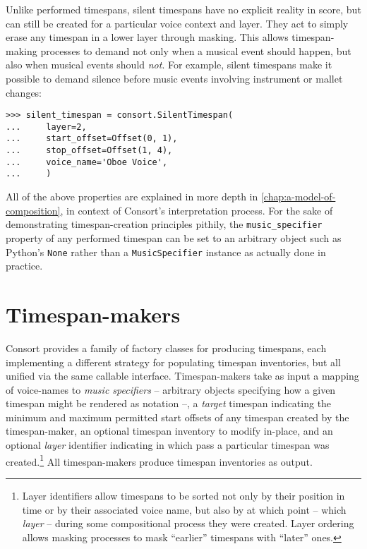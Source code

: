 \noindent Unlike performed timespans, silent timespans have no explicit reality
in score, but can still be created for a particular voice context and layer.
They act to simply erase any timespan in a lower layer through masking. This
allows timespan-making processes to demand not only when a musical event should
happen, but also when musical events should \emph{not}. For example, silent
timespans make it possible to demand silence before music events involving
instrument or mallet changes:

\begin{comment}
<abjad>
silent_timespan = consort.SilentTimespan(
    layer=2,
    start_offset=Offset(0, 1),
    stop_offset=Offset(1, 4),
    voice_name='Oboe Voice',
    )
</abjad>
\end{comment}

\begin{singlespacing}
\vspace{-0.5\baselineskip}
\begin{lstlisting}
>>> silent_timespan = consort.SilentTimespan(
...     layer=2,
...     start_offset=Offset(0, 1),
...     stop_offset=Offset(1, 4),
...     voice_name='Oboe Voice',
...     )
\end{lstlisting}
\end{singlespacing}

\noindent All of the above properties are explained in more depth in
\autoref{chap:a-model-of-composition}, in context of Consort's interpretation
process. For the sake of demonstrating timespan-creation principles pithily,
the \texttt{music\_specifier} property of any performed timespan can be set to
an arbitrary object such as Python's \texttt{None} rather than a
\texttt{MusicSpecifier} instance as actually done in practice.

\section{Timespan-makers}
\label{sec:timespan-makers}

Consort provides a family of factory classes for producing timespans, each
implementing a different strategy for populating timespan inventories, but all
unified via the same callable interface. Timespan-makers take as input a
mapping of voice-names to \emph{music specifiers} -- arbitrary objects
specifying how a given timespan might be rendered as notation --, a
\emph{target} timespan indicating the minimum and maximum permitted start
offsets of any timespan created by the timespan-maker, an optional timespan
inventory to modify in-place, and an optional \emph{layer} identifier
indicating in which pass a particular timespan was created.\footnote{Layer
identifiers allow timespans to be sorted not only by their position in time or
by their associated voice name, but also by at which point -- which
\emph{layer} -- during some compositional process they were created. Layer
ordering allows masking processes to mask \enquote{earlier} timespans with
\enquote{later} ones.} All timespan-makers produce timespan inventories as
output.

